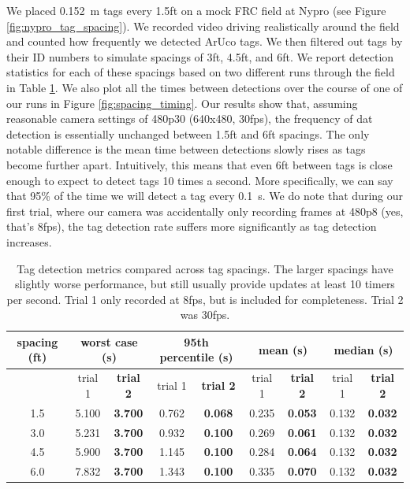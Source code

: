 \documentclass{article}
\begin{document}
    We placed \SI{0.152}{\meter} tags every 1.5ft on a mock FRC field at Nypro (see Figure \ref{fig:nypro_tag_spacing}). We recorded video driving realistically around the field and counted how frequently we detected ArUco tags. We then filtered out tags by their ID numbers to simulate spacings of 3ft, 4.5ft, and 6ft. We report detection statistics for each of these spacings based on two different runs through the field in Table \ref{table:spacing_timing}. We also plot all the times between detections over the course of one of our runs in Figure \ref{fig:spacing_timing}. Our results show that, assuming reasonable camera settings of 480p30 (640x480, 30fps), the frequency of dat detection is essentially unchanged between 1.5ft and 6ft spacings. The only notable difference is the mean time between detections slowly rises as tags become further apart. Intuitively, this means that even 6ft between tags is close enough to expect to detect tags 10 times a second. More specifically, we can say that 95\% of the time we will detect a tag every \SI{0.1}{\second}. We do note that during our first trial, where our camera was accidentally only recording frames at 480p8 (yes, that's 8fps), the tag detection rate suffers more significantly as tag detection increases.

    \begin{table}[H]
      \centering
      \begin{tabular}{|c|c|c|c|c|c|c|c|c|} \hline
        spacing (ft) & \multicolumn{2}{c}{worst case (s)} & \multicolumn{2}{c}{95th percentile (s)} & \multicolumn{2}{c}{mean (s)} & \multicolumn{2}{c|}{median (s)} \\ \hline
            & trial 1 & \textbf{trial 2} & trial 1 & \textbf{trial 2} & trial 1 & \textbf{trial 2} & trial 1 & \textbf{trial 2} \\ \hline
        1.5 & 5.100 & \textbf{3.700} & 0.762 & \textbf{0.068} & 0.235 & \textbf{0.053} & 0.132 & \textbf{0.032} \\ \hline
        3.0 & 5.231 & \textbf{3.700} & 0.932 & \textbf{0.100} & 0.269 & \textbf{0.061} & 0.132 & \textbf{0.032} \\ \hline
        4.5 & 5.900 & \textbf{3.700} & 1.145 & \textbf{0.100} & 0.284 & \textbf{0.064} & 0.132 & \textbf{0.032} \\ \hline
        6.0 & 7.832 & \textbf{3.700} & 1.343 & \textbf{0.100} & 0.335 & \textbf{0.070} & 0.132 & \textbf{0.032} \\ \hline
      \end{tabular}
      \caption{Tag detection metrics compared across tag spacings.
      The larger spacings have slightly worse performance, but still usually provide updates at least 10 timers per second.
      Trial 1 only recorded at 8fps, but is included for completeness. Trial 2 was 30fps.}
      \label{table:spacing_timing}
    \end{table}
\end{document}
